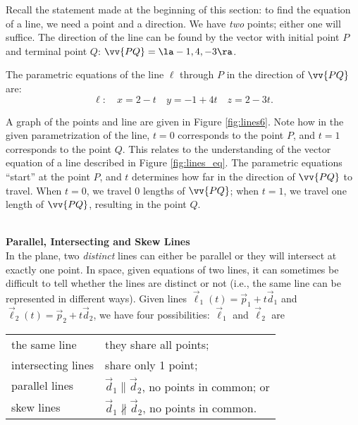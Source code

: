 {Recall the statement made at the beginning of this section: to find the equation of a line, we need a point and a direction. We have \emph{two} points; either one will suffice. The direction of the line can be found by the vector with initial point $P$ and terminal point $Q$: $\vv{PQ} = \la -1,4,-3\ra$.

The parametric equations of the line $\ell$ through $P$ in the direction of $\vv{PQ}$ are:
$$\ell: \quad x= 2-t\quad y=-1+4t \quad z=2-3t.$$

A graph of the points and line are given in Figure \ref{fig:lines6}. Note how in the given parametrization of the line, $t=0$ corresponds to the point $P$, and $t=1$ corresponds to the point $Q$. This relates to the understanding of the vector equation of a line described in Figure \ref{fig:lines_eq}. The parametric equations ``start'' at the point $P$, and $t$ determines how far in the direction of $\vv{PQ}$ to travel. When $t=0$, we travel 0 lengths of $\vv{PQ}$; when $t=1$, we travel one length of $\vv{PQ}$, resulting in the point $Q$.
}\\

\noindent \textbf{\large Parallel, Intersecting and Skew Lines}\\

In the plane, two \emph{distinct} lines can either be parallel or they will intersect at exactly one point. In space, given equations of two lines, it can sometimes be difficult to tell whether the lines are distinct or not (i.e., the same line can be represented in different ways). Given lines $\vec\ell_1(t) = \vec p_1 + t\vec d_1$ and $\vec \ell_2(t) = \vec p_2+t\vec d_2$, we have four possibilities: $\vec \ell_1$ and $\vec \ell_2$ are

\begin{center}
\begin{tabular}{p{100pt}p{150pt}}
the same line & they share all points; \\
intersecting lines & share only 1 point;\\
parallel lines & $\vec d_1\parallel \vec d_2$, no points in common; or \\
skew lines & $\vec d_1\nparallel \vec d_2$, no points in common. 
\end{tabular}
\end{center}

